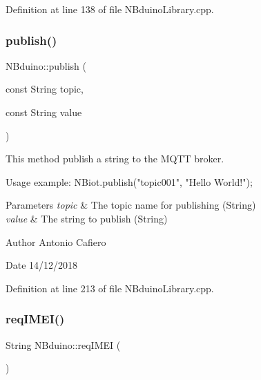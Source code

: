 Definition at line 138 of file N\+Bduino\+Library.\+cpp.

\mbox{\label{class_n_bduino_a1c9526fbb36956b1cd41e33dd9133394}} 
\subsubsection{\texorpdfstring{publish()}{publish()}}
{\footnotesize\ttfamily N\+Bduino\+::publish (\begin{DoxyParamCaption}\item[{const String}]{topic,  }\item[{const String}]{value }\end{DoxyParamCaption})}

This method publish a string to the M\+Q\+TT broker. 
\begin{DoxyCode}
Usage example:
    NBiot.publish(\textcolor{stringliteral}{"topic001"}, \textcolor{stringliteral}{"Hello World!"});
\end{DoxyCode}
 
\begin{DoxyParams}{Parameters}
{\em topic} & The topic name for publishing (String) \\
\hline
{\em value} & The string to publish (String) \\
\hline
\end{DoxyParams}
\begin{DoxyAuthor}{Author}
Antonio Cafiero 
\end{DoxyAuthor}
\begin{DoxyDate}{Date}
14/12/2018 
\end{DoxyDate}


Definition at line 213 of file N\+Bduino\+Library.\+cpp.

\mbox{\label{class_n_bduino_a3d96fbfb52c89cd55e9a7a3f387c6945}} 
\subsubsection{\texorpdfstring{req\+I\+M\+E\+I()}{reqIMEI()}}
{\footnotesize\ttfamily String N\+Bduino\+::req\+I\+M\+EI (\begin{DoxyParamCaption}{ }\end{DoxyParamCaption})}

